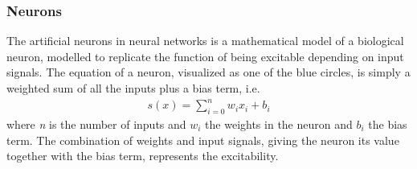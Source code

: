         \subsubsection{Neurons}
            The artificial neurons in neural networks is a mathematical model of a biological
            neuron, modelled to replicate the function of being excitable depending on input
            signals. The equation of a neuron, visualized as one of the blue circles,
            is simply a weighted sum of all the inputs plus a bias term, i.e.
            \begin{align}
                s(x) = \displaystyle\sum_{i=0}^n w_i x_i + b_i
            \end{align}
            \vspace{3mm}
            where \emph{n} is the number of inputs and \emph{$w_i$} the weights in the neuron and \emph{$b_i$} 
            the bias term. The combination of weights and input signals, giving the neuron its value
            together with the bias term, represents the excitability.

